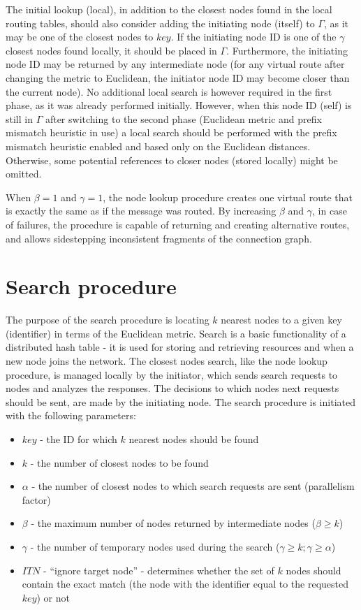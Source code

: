 The initial lookup (local), in addition to the closest nodes found in the local routing tables, should also consider adding the initiating node (itself) to $\Gamma$, as it may be one of the closest nodes to $key$. If the initiating node ID is one of the $\gamma$ closest nodes found locally, it should be placed in $\Gamma$. Furthermore, the initiating node ID may be returned by any intermediate node (for any virtual route after changing the metric to Euclidean, the initiator node ID may become closer than the current node). No additional local search is however required in the first phase, as it was already performed initially. However, when this node ID (self) is still in $\Gamma$ after switching to the second phase (Euclidean metric and prefix mismatch heuristic in use) a local search should be performed with the prefix mismatch heuristic enabled and based only on the Euclidean distances. Otherwise, some potential references to closer nodes (stored locally) might be omitted.

When $\beta = 1$ and $\gamma = 1$, the node lookup procedure creates one virtual route that is exactly the same as if the message was routed. By increasing $\beta$ and $\gamma$, in case of failures, the procedure is capable of returning and creating alternative routes, and allows sidestepping inconsistent fragments of the connection graph.




\section{Search procedure}
\label{sec:search}

The purpose of the search procedure is locating $k$ nearest nodes to a given key (identifier) in terms of the Euclidean metric. Search is a basic functionality of a distributed hash table - it is used for storing and retrieving resources and when a new node joins the network. The closest nodes search, like the node lookup procedure, is managed locally by the initiator, which sends search requests to nodes and analyzes the responses. The decisions to which nodes next requests should be sent, are made by the initiating node. The search procedure is initiated with the following parameters:

\begin{itemize}
	\renewcommand{\labelitemi}{$\bullet$}
	\item $key$ - the ID for which $k$ nearest nodes should be found
	\item $k$ - the number of closest nodes to be found
	\item $\alpha$ - the number of closest nodes to which search requests are sent (parallelism factor)
	\item $\beta$ - the maximum number of nodes returned by intermediate nodes ($\beta \geq k$)
	\item $\gamma$ - the number of temporary nodes used during the search ($\gamma \geq k; \gamma \geq \alpha$)
	\item $ITN$ - ``ignore target node'' - determines whether the set of $k$ nodes should contain the exact match (the node with the identifier equal to the requested $key$) or not
\end{itemize}

